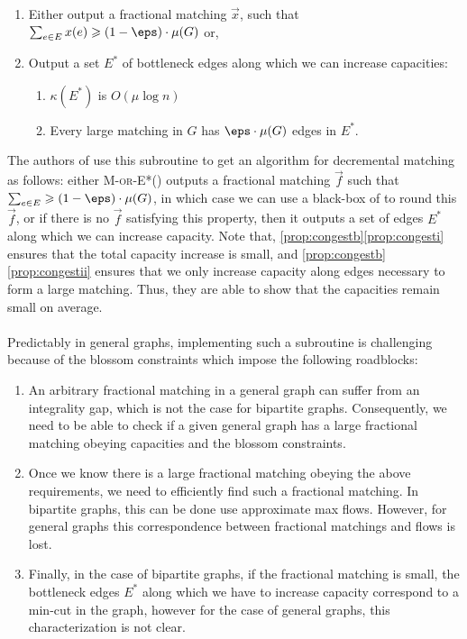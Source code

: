 \begin{enumerate}
\item Either output a fractional matching $\vec{x}$, such that $\sum_{e\in E}x(e)\geqslant (1-\eps)\cdot \mu(G)$ or,
\item Output a set $E^*$ of bottleneck edges along which we can increase capacities: \label{prop:congestb}
\begin{enumerate}[label=(\roman*)]
\item $\kappa(E^*)$ is $O(\mu\log n)$\label{prop:congesti}
\item Every large matching in $G$ has $\eps\cdot\mu(G)$ edges in $E^*$. \label{prop:congestii}
\end{enumerate}
\end{enumerate} 
The authors of \cite{BPT20} use this subroutine to get an algorithm for decremental matching as follows: either \textsc{M-or-E*}() outputs a fractional matching $\vec{f}$ such that $\sum_{e\in E}\geqslant (1-\eps)\cdot \mu(G)$, in which case we can use a black-box of \cite{Wajc2020} to round this $\vec{f}$, or if there is no $\vec{f}$ satisfying this property, then it outputs a set of edges $E^*$ along which we can increase capacity. Note that, \ref{prop:congestb}\ref{prop:congesti} ensures that the total capacity increase is small, and \ref{prop:congestb}\ref{prop:congestii} ensures that we only increase capacity along edges necessary to form a large matching. Thus, they are able to show that the capacities remain small on average. \\ \\
Predictably in general graphs, implementing such a subroutine is challenging because of the blossom constraints which impose the following roadblocks:
\begin{enumerate}
\item An arbitrary fractional matching in a general graph can suffer from an integrality gap, which is not the case for bipartite graphs. Consequently, we need to be able to check if a given general graph has a large fractional matching obeying capacities and the blossom constraints. \label{item:issuea}
\item Once we know there is a large fractional matching obeying the above requirements, we need to efficiently find such a fractional matching. In bipartite graphs, this can be done use approximate max flows. However, for general graphs this correspondence between fractional matchings and flows is lost. \label{item:issueb}
\item Finally, in the case of bipartite graphs, if the fractional matching is small, the bottleneck edges $E^*$ along which we have to increase capacity correspond to a min-cut in the graph, however for the case of general graphs, this characterization is not clear.\label{item:issuec}
\end{enumerate}

